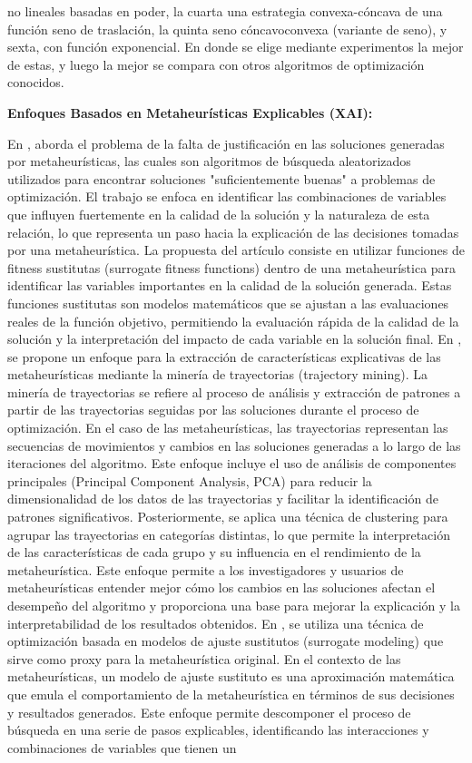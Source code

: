no lineales basadas en poder, la cuarta una estrategia convexa-cóncava de una función seno de traslación, la quinta seno cóncavoconvexa (variante de seno), y sexta, con función exponencial. En donde se elige mediante experimentos la mejor de estas, y luego la mejor se compara con otros algoritmos de optimización conocidos.


\textbf{Enfoques Basados en Metaheurísticas Explicables (XAI):}

En \cite{wallace2021towards}, aborda el problema de la falta de justificación en las soluciones generadas por metaheurísticas, las cuales son algoritmos de búsqueda aleatorizados utilizados para encontrar soluciones "suficientemente buenas" a problemas de optimización. El trabajo se enfoca en identificar las combinaciones de variables que influyen fuertemente en la calidad de la solución y la naturaleza de esta relación, lo que representa un paso hacia la explicación de las decisiones tomadas por una metaheurística. La propuesta del artículo consiste en utilizar funciones de fitness sustitutas (surrogate fitness functions) dentro de una metaheurística para identificar las variables importantes en la calidad de la solución generada. Estas funciones sustitutas son modelos matemáticos que se ajustan a las evaluaciones reales de la función objetivo, permitiendo la evaluación rápida de la calidad de la solución y la interpretación del impacto de cada variable en la solución final. En \cite{towardsXAImh_featureExtraction}, se propone un enfoque para la extracción de características explicativas de las metaheurísticas mediante la minería de trayectorias (trajectory mining). La minería de trayectorias se refiere al proceso de análisis y extracción de patrones a partir de las trayectorias seguidas por las soluciones durante el proceso de optimización. En el caso de las metaheurísticas, las trayectorias representan las secuencias de movimientos y cambios en las soluciones generadas a lo largo de las iteraciones del algoritmo. Este enfoque incluye el uso de análisis de componentes principales (Principal Component Analysis, PCA) para reducir la dimensionalidad de los datos de las trayectorias y facilitar la identificación de patrones significativos. Posteriormente, se aplica una técnica de clustering para agrupar las trayectorias en categorías distintas, lo que permite la interpretación de las características de cada grupo y su influencia en el rendimiento de la metaheurística. Este enfoque permite a los investigadores y usuarios de metaheurísticas entender mejor cómo los cambios en las soluciones afectan el desempeño del algoritmo y proporciona una base para mejorar la explicación y la interpretabilidad de los resultados obtenidos. En \cite{singh2022towards}, se utiliza una técnica de optimización basada en modelos de ajuste sustitutos (surrogate modeling) que sirve como proxy para la metaheurística original. En el contexto de las metaheurísticas, un modelo de ajuste sustituto es una aproximación matemática que emula el comportamiento de la metaheurística en términos de sus decisiones y resultados generados. Este enfoque permite descomponer el proceso de búsqueda en una serie de pasos explicables, identificando las interacciones y combinaciones de variables que tienen un 